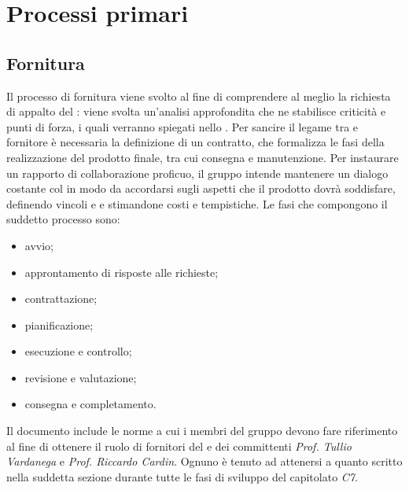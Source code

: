 \section{Processi primari}
\subsection{Fornitura}

Il processo di fornitura viene svolto al fine di comprendere al meglio la richiesta di appalto del : viene svolta un'analisi approfondita che ne stabilisce criticità e punti di forza, i quali verranno spiegati nello \SdF{}. Per sancire il legame tra  e fornitore è necessaria la definizione di un contratto, che formalizza le fasi della realizzazione del prodotto finale, tra cui consegna e manutenzione. Per instaurare un rapporto di collaborazione proficuo, il gruppo intende mantenere un dialogo costante col  in modo da accordarsi sugli aspetti che il prodotto dovrà soddisfare, definendo vincoli e  e stimandone costi e tempistiche.
Le fasi che compongono il suddetto processo sono: 
\begin{itemize}
	\item avvio;
	\item approntamento di risposte alle richieste;
	\item contrattazione;
	\item pianificazione;
	\item esecuzione e controllo;
	\item revisione e valutazione;
	\item consegna e completamento.
\end{itemize}
Il documento include le norme a cui i membri del gruppo \Gruppo{} devono fare riferimento al fine di ottenere il ruolo di fornitori del  \proponente{} e dei committenti \textit{Prof. Tullio Vardanega} e \textit{Prof. Riccardo Cardin}. Ognuno è tenuto ad attenersi a quanto scritto nella suddetta sezione durante tutte le fasi di sviluppo del capitolato \textit{C7}.

